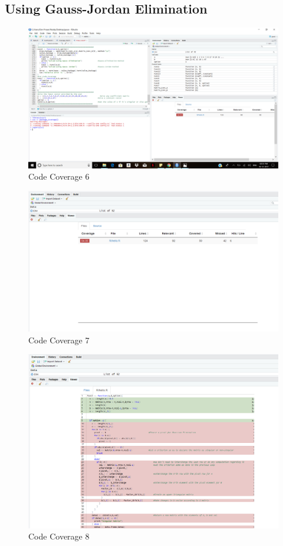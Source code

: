 \documentclass[12pt, titlepage]{article}
\begin{document}
\subsection{Using Gauss-Jordan Elimination}

\begin{figure}[H]
\centering
 \includegraphics[width=120mm]{CV9}
  \caption{Code Coverage 6}
  \label{fig:CV9}
\end{figure}

\begin{figure}[H]
\centering
 \includegraphics[width=120mm]{CV4}
  \caption{Code Coverage 7}
  \label{fig:CV4}
\end{figure}

\begin{figure}[H]
\centering
 \includegraphics[width=120mm]{CV5}
  \caption{Code Coverage 8}
  \label{fig:CV5}
\end{figure}
\end{document}
